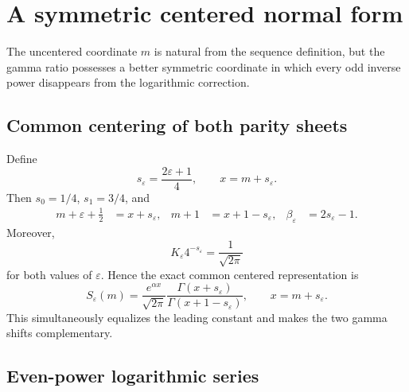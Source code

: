 \documentclass[11pt,a4paper]{article}
\theoremstyle{clean}
\theoremstyle{definition}
\newcommand{\eps}{\varepsilon}
\newcommand{\al}{\alpha}
\newcommand{\be}{\beta}
\begin{document}
\section{A symmetric centered normal form}
\label{sec:centered}

The uncentered coordinate \(m\) is natural from the sequence definition, but the gamma ratio possesses a better symmetric coordinate in which every odd inverse power disappears from the logarithmic correction.

\subsection{Common centering of both parity sheets}

Define
\begin{equation}
 s_\eps=\frac{2\eps+1}{4},
 \qquad x=m+s_\eps.
 \label{eq:center-shift}
\end{equation}
Then \(s_0=1/4\), \(s_1=3/4\), and
\begin{align}
 m+\eps+\frac12&=x+s_\eps,
 &m+1&=x+1-s_\eps,
 &\be_\eps&=2s_\eps-1.
 \label{eq:center-identities}
\end{align}
Moreover,
\begin{equation}
 K_\eps4^{-s_\eps}=\frac1{\sqrt{2\pi}}
 \label{eq:center-common-K}
\end{equation}
for both values of \(\eps\).  Hence the exact common centered representation is
\begin{equation}
 \boxed{\displaystyle
 S_\eps(m)=\frac{e^{\al x}}{\sqrt{2\pi}}
 \frac{\Gamma(x+s_\eps)}{\Gamma(x+1-s_\eps)},
 \qquad x=m+s_\eps.}
 \label{eq:center-exact}
\end{equation}
This simultaneously equalizes the leading constant and makes the two gamma shifts complementary.

\subsection{Even-power logarithmic series}
\end{document}
